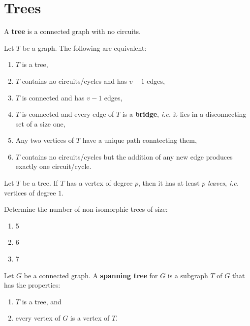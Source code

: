 \section{Trees}\label{sec:trees}

\begin{definition} A \textbf{tree} is a connected graph with no circuits.
\end{definition}

\begin{theorem} Let $T$ be a graph.  The following are equivalent:
\begin{enumerate}
    \item $T$ is a tree,
    \item $T$ contains no circuits/cycles and has $v-1$ edges,
    \item $T$ is connected and has $v-1$ edges,
    \item $T$ is connected and every edge of $T$ is a \textbf{bridge}, \textit{i.e.} it lies in a disconnecting set of a size one,
    \item Any two vertices of $T$ have a unique path conntecting them,
    \item $T$ contains no circuits/cycles but the addition of any new edge produces exactly one circuit/cycle.
\end{enumerate}
\end{theorem}

\begin{theorem} Let $T$ be a tree.  If $T$ has a vertex of degree $p$, then it has at least $p$ \textit{leaves}, \textit{i.e.} vertices of degree $1$.
\end{theorem}

\begin{exercise}Determine the number of non-isomorphic trees of size:
\begin{enumerate}
    \item 5
    \item 6
    \item 7
\end{enumerate}
\end{exercise}

\begin{definition} Let $G$ be a connected graph.  A \textbf{spanning tree} for $G$ is a subgraph $T$ of $G$ that has the properties:
\begin{enumerate}
    \item $T$ is a tree, and
    \item every vertex of $G$ is a vertex of $T$.
\end{enumerate}
\end{definition}

